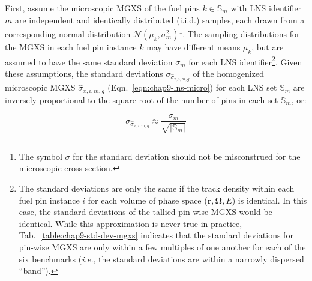 First, assume the microscopic \ac{MGXS} of the fuel pins $k \in \mathbb{S}_{m}$ with \ac{LNS} identifier $m$ are independent and identically distributed (i.i.d.) samples, each drawn from a corresponding normal distribution $\mathcal{N}(\mu_{k}, \sigma_{m}^2)$\footnote{The symbol $\sigma$ for the standard deviation should not be misconstrued for the microscopic cross section.}. The sampling distributions for the \ac{MGXS} in each fuel pin instance $k$ may have different means $\mu_{k}$, but are assumed to have the same standard deviation $\sigma_{m}$ for each \ac{LNS} identifier\footnote{The standard deviations are only the same if the track density within each fuel pin instance $i$ for each volume of phase space ($\mathbf{r},\mathbf{\Omega},E$) is identical. In this case, the standard deviations of the tallied pin-wise \ac{MGXS} would be identical. While this approximation is never true in practice, Tab.~\ref{table:chap9-std-dev-mgxs} indicates that the standard deviations for pin-wise \ac{MGXS} are only within a few multiples of one another for each of the six benchmarks (\textit{i.e.}, the standard deviations are within a narrowly dispersed ``band'').}. Given these assumptions, the standard deviations $\sigma_{\hat{\sigma}_{x,i,m,g}}$ of the homogenized microscopic \ac{MGXS} $\hat{\sigma}_{x,i,m,g}$ (Eqn.~\ref{eqn:chap9-lns-micro}) for each \ac{LNS} set $\mathbb{S}_{m}$  are inversely proportional to the square root of the number of pins in each set $\mathbb{S}_{m}$, or:

\begin{equation}
\label{eqn:chap9-homogenize-std-dev}
\sigma_{\hat{\sigma}_{x,i,m,g}} \approx \frac{\sigma_{m}}{\sqrt{|\mathbb{S}_{m}|}}
\end{equation}

